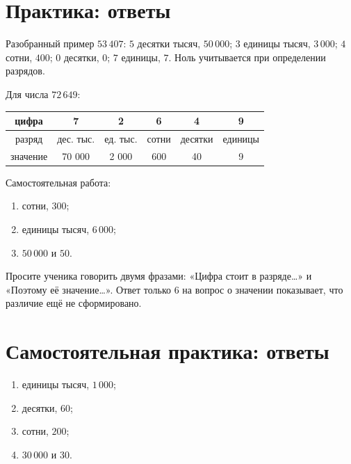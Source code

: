 \section{Практика: ответы}

Разобранный пример \(53\,407\): \(5\) \textemdash{} десятки тысяч, \(50\,000\);
\(3\) \textemdash{} единицы тысяч, \(3\,000\); \(4\) \textemdash{} сотни,
\(400\); \(0\) \textemdash{} десятки, \(0\); \(7\) \textemdash{} единицы,
\(7\). Ноль учитывается при
определении разрядов.

Для числа \(72\,649\):

\begin{center}
\renewcommand{\arraystretch}{1.32}
\begin{tabular}{c|ccccc}
  \toprule
  цифра & 7 & 2 & 6 & 4 & 9 \\
  \midrule
  разряд & дес. тыс. & ед. тыс. & сотни & десятки & единицы \\
  значение & 70 000 & 2 000 & 600 & 40 & 9 \\
  \bottomrule
\end{tabular}
\end{center}

Самостоятельная работа:
\begin{enumerate}
  \item сотни, \(300\);
  \item единицы тысяч, \(6\,000\);
  \item \(50\,000\) и \(50\).
\end{enumerate}

\begin{teacherbox}
  Просите ученика говорить двумя фразами: «Цифра стоит в разряде…» и
  «Поэтому её значение…». Ответ только \(6\) на вопрос о значении показывает,
  что различие ещё не сформировано.
\end{teacherbox}

\newpage
\section{Самостоятельная практика: ответы}

\begin{teacherbox}
  \begin{enumerate}
    \item единицы тысяч, \(1\,000\);
    \item десятки, \(60\);
    \item сотни, \(200\);
    \item \(30\,000\) и \(30\).
  \end{enumerate}
\end{teacherbox}

